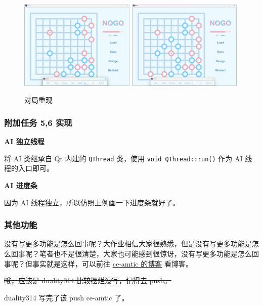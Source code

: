 \documentclass{noithesis}
\begin{document}
	\begin{figure}[htbp]
		\centering
		
		\includegraphics[width=5.5cm]{img/review1.png}	
		\includegraphics[width=5.5cm]{img/review2.png}
		
		\caption{对局重现}
	\end{figure}

    \subsubsection{附加任务 5,6 实现}
    
    \textbf{AI 独立线程}
    
    将 AI 类继承自 Qt 内建的 \verb|QThread| 类，使用 \verb|void QThread::run()| 作为 AI 线程的入口即可。
    
    \textbf{AI 进度条}
    
    因为 AI 线程独立，所以仿照上例画一下进度条就好了。

	\subsubsection{其他功能}
	
	没有写更多功能是怎么回事呢？大作业相信大家很熟悉，但是没有写更多功能是怎么回事呢？笔者也不是很清楚，大家也可能感到很惊讶，没有写更多功能是怎么回事呢？但事实就是这样，可以前往 \href{https://ce-amtic.github.io/}{ce-amtic 的博客} 看博客。
	
	\sout{哦，应该是 duality314 比较摆烂没写，记得去 push。}
	
	duality314 写完了该 push ce-amtic 了。
	
\end{document}
